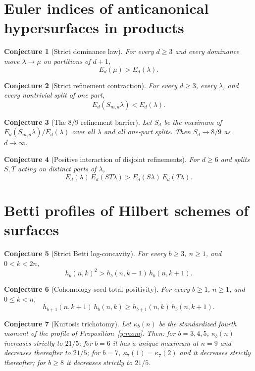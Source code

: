 \documentclass[11pt]{article}
\newtheorem{conjecture}{Conjecture}
\theoremstyle{definition}
\begin{document}
\section{Euler indices of anticanonical hypersurfaces in products}

\begin{conjecture}[Strict dominance law]\label{y1}
For every $d\ge3$ and every dominance move $\lambda\to\mu$ on partitions of $d+1$,
\[
E_d(\mu)>E_d(\lambda).
\]
\end{conjecture}

\begin{conjecture}[Strict refinement contraction]\label{y2}
For every $d\ge3$, every $\lambda$, and every nontrivial split of one part,
\[
E_d(S_{m,a}\lambda)<E_d(\lambda).
\]
\end{conjecture}

\begin{conjecture}[The $8/9$ refinement barrier]\label{y3}
Let $S_d$ be the maximum of $E_d(S_{m,a}\lambda)/E_d(\lambda)$ over all $\lambda$ and all one-part splits.  Then $S_d\to8/9$ as $d\to\infty$.
\end{conjecture}

\begin{conjecture}[Positive interaction of disjoint refinements]\label{y4}
For $d\ge6$ and splits $S,T$ acting on distinct parts of $\lambda$,
\[
E_d(\lambda)\,E_d(ST\lambda)>E_d(S\lambda)\,E_d(T\lambda).
\]
\end{conjecture}

\section{Betti profiles of Hilbert schemes of surfaces}

\begin{conjecture}[Strict Betti log-concavity]\label{y5}
For every $b\ge3$, $n\ge1$, and $0<k<2n$,
\[
h_b(n,k)^2>h_b(n,k-1)\,h_b(n,k+1).
\]
\end{conjecture}

\begin{conjecture}[Cohomology-seed total positivity]\label{y6}
For every $b\ge1$, $n\ge1$, and $0\le k<n$,
\[
h_{b+1}(n,k+1)\,h_b(n,k)\ge h_{b+1}(n,k)\,h_b(n,k+1).
\]
\end{conjecture}

\begin{conjecture}[Kurtosis trichotomy]\label{y7}
Let $\kappa_b(n)$ be the standardized fourth moment of the profile of Proposition~\ref{y:mom}.  Then: for $b=3,4,5$, $\kappa_b(n)$ increases strictly to $21/5$; for $b=6$ it has a unique maximum at $n=9$ and decreases thereafter to $21/5$; for $b=7$, $\kappa_7(1)=\kappa_7(2)$ and it decreases strictly thereafter; for $b\ge8$ it decreases strictly to $21/5$.
\end{conjecture}
\end{document}
